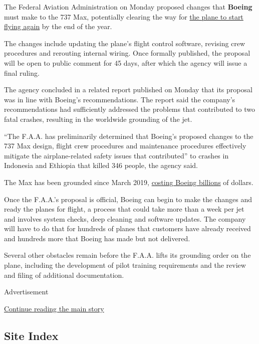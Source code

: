 The Federal Aviation Administration on Monday proposed changes that
\textbf{Boeing} must make to the 737 Max, potentially clearing the way
for
\href{https://www.nytimes3xbfgragh.onion/2020/07/15/business/boeing-737-max-return.html}{the
plane to start flying again} by the end of the year.

The changes include updating the plane's flight control software,
revising crew procedures and rerouting internal wiring. Once formally
published, the proposal will be open to public comment for 45 days,
after which the agency will issue a final ruling.

The agency concluded in a related report published on Monday that its
proposal was in line with Boeing's recommendations. The report said the
company's recommendations had sufficiently addressed the problems that
contributed to two fatal crashes, resulting in the worldwide grounding
of the jet.

``The F.A.A. has preliminarily determined that Boeing's proposed changes
to the 737 Max design, flight crew procedures and maintenance procedures
effectively mitigate the airplane-related safety issues that
contributed'' to crashes in Indonesia and Ethiopia that killed 346
people, the agency said.

The Max has been grounded since March 2019,
\href{https://www.nytimes3xbfgragh.onion/2020/01/29/business/boeing-737-max-costs.html}{costing
Boeing billions} of dollars.

Once the F.A.A.'s proposal is official, Boeing can begin to make the
changes and ready the planes for flight, a process that could take more
than a week per jet and involves system checks, deep cleaning and
software updates. The company will have to do that for hundreds of
planes that customers have already received and hundreds more that
Boeing has made but not delivered.

Several other obstacles remain before the F.A.A. lifts its grounding
order on the plane, including the development of pilot training
requirements and the review and filing of additional documentation.

Advertisement

\protect\hyperlink{after-bottom}{Continue reading the main story}

\hypertarget{site-index}{%
\subsection{Site Index}\label{site-index}}

